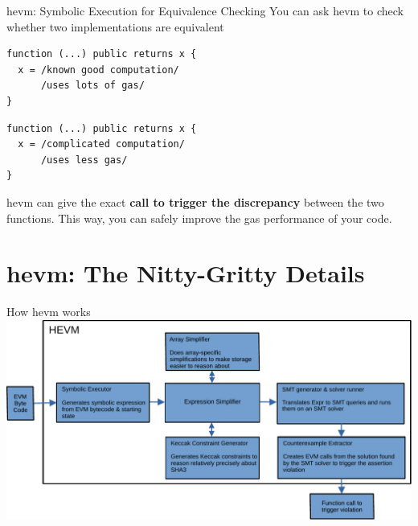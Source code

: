 \documentclass[aspectratio=169]{beamer}
\begin{document}
\begin{frame}[fragile=singleslide]{hevm: Symbolic Execution for Equivalence Checking}
You can ask hevm to check whether two implementations are equivalent
\bigskip
\\

\begin{minipage}[b]{0.45\textwidth}
\begin{Verbatim}[frame=single, framerule=0.2mm, framesep=2mm,fontsize=\small]
function (...) public returns x {
  x = /known good computation/
      /uses lots of gas/
}
    \end{Verbatim}
  \end{minipage}
  \begin{minipage}[b]{0.45\textwidth}
  \begin{Verbatim}[frame=single, framerule=0.2mm, framesep=2mm,fontsize=\small]
function (...) public returns x {
  x = /complicated computation/
      /uses less gas/
}
\end{Verbatim}
\end{minipage}

hevm can give the exact \textbf{call to trigger the discrepancy} between the two functions. This way, you can safely improve the gas performance of your code.
\end{frame}

\section{hevm: The Nitty-Gritty Details}
\begin{frame}{How hevm works}
\centering
\includegraphics[scale=0.6]{hevm-overview}

\end{frame}
\end{document}
